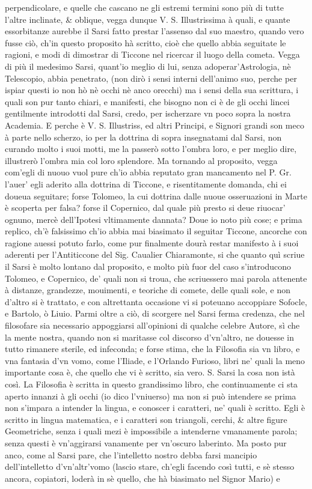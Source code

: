 \documentclass[11pt,twoside,openany]{book}
\begin{document}
perpendicolare, e quelle che cascano ne gli estremi termini sono più di tutte l'altre inclinate, \& oblique, vegga dunque V. S. Illustrissima à quali, e quante essorbitanze aurebbe il Sarsi fatto prestar l'assenso dal suo maestro, quando vero fusse ciò, ch'in questo proposito hà scritto, cioè che quello abbia seguitate le ragioni, e modi di dimostrar di Ticcone nel ricercar il luogo della cometa. Vegga di più il medesimo Sarsi, quant'io meglio di lui, senza adoperar'Astrologia, nè Telescopio, abbia penetrato, (non dirò i sensi interni dell'animo suo, perche per ispiar questi io non hò nè occhi nè anco orecchi) ma i sensi della sua scrittura, i quali son pur tanto chiari, e manifesti, che bisogno non ci è de gli occhi lincei gentilmente introdotti dal Sarsi, credo, per ischerzare vn poco sopra la nostra Academia. E perche è V. S. Illustriss, ed altri Principi, e Signori grandi son meco à parte nello scherzo, io per la dottrina di sopra insegnatami dal Sarsi, non curando molto i suoi motti, me la passerò sotto l'ombra loro, e per meglio dire, illustrerò l'ombra mia col loro splendore. Ma tornando al proposito, vegga com'egli di nuouo vuol pure ch'io abbia reputato gran mancamento nel P. Gr. l'auer' egli aderito alla dottrina di Ticcone, e risentitamente domanda, chi ei doueua seguitare; forse Tolomeo, la cui dottrina dalle nuoue osseruazioni in Marte è scoperta per falsa? forse il Copernico, dal quale più presto si deue riuocar' ognuno, mercè dell'Ipotesi vltimamente dannata? Doue io noto più cose; e prima replico, ch'è falsissimo ch'io abbia mai biasimato il seguitar Ticcone, ancorche con ragione auessi potuto farlo, come pur finalmente dourà restar manifesto à i suoi aderenti per l'Antiticcone del Sig. Caualier Chiaramonte, si che quanto quì scriue il Sarsi è molto lontano dal proposito, e molto più fuor del caso s'introducono Tolomeo, e Copernico, de' quali non si troua, che scriuessero mai parola attenente à distanze, grandezze, mouimenti, e teoriche di comete, delle quali sole, e non d'altro si è trattato, e con altrettanta occasione vi si poteuano accoppiare Sofocle, e Bartolo, ò Liuio. Parmi oltre a ciò, di scorgere nel Sarsi ferma credenza, che nel filosofare sia necessario appoggiarsi all'opinioni di qualche celebre Autore, sì che la mente nostra, quando non si maritasse col discorso d'vn'altro, ne douesse in tutto rimanere sterile, ed infeconda; e forse stima, che la Filosofia sia vn libro, e vna fantasia d'vn vomo, come l'Iliade, e l'Orlando Furioso, libri ne' quali la meno importante cosa è, che quello che vi è scritto, sia vero. S. Sarsi la cosa non istà così. La Filosofia è scritta in questo grandissimo libro, che continuamente ci sta aperto innanzi à gli occhi (io dico l'vniuerso) ma non si può intendere se prima non s'impara a intender la lingua, e conoscer i caratteri, ne' quali è scritto. Egli è scritto in lingua matematica, e i caratteri son triangoli, cerchi, \& altre figure Geometriche, senza i quali mezi è impossibile a intenderne vmanamente parola; senza questi è vn'aggirarsi vanamente per vn'oscuro laberinto. Ma posto pur anco, come al Sarsi pare, che l'intelletto nostro debba farsi mancipio dell'intelletto d'vn'altr'vomo (lascio stare, ch'egli facendo così tutti, e sè stesso ancora, copiatori, loderà in sè quello, che hà biasimato nel Signor Mario) e 
\end{document}
